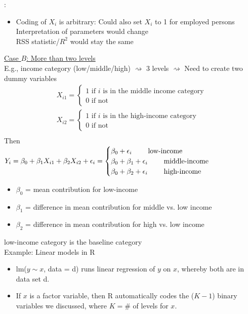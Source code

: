 \documentclass[11pt,a4paper,numbers=endperiod]{scrartcl}
\newcommand{\id}{\hspace*{4mm}}
\newcommand{\tit}[1]{\begin{large} \underline{\text{#1}}\end{large}}
\begin{document}
{\tit{Note}: \begin{itemize}
	\item Coding of $X_i$ is arbitrary: Could also set $X_i$ to 1 for employed persons\\
	\id {} Interpretation of parameters would change\\
	\id {} RSS statistic/$R^2$ would stay the same
\end{itemize}
\underline{Case $B$: More than two levels}\\
E.g., income category (low/middle/high) $\rightsquigarrow$ 3 levels $\rightsquigarrow$ Need to create two dummy variables \begin{align*}
	X_{i1} = \begin{cases}
	 1 \text{ if $i$ is in the middle income category}\\
	 0 \text{ if not}
	\end{cases}\\
	X_{i2} = \begin{cases}
	1 \text{ if $i$ is in the high-income category}\\
	0 \text{ if not}
	\end{cases}\\
\end{align*}
Then\\
$Y_i = \beta_0 + \beta_1 X_{i1} + \beta_2 X_{i2} + \epsilon_i = \begin{cases}
	\beta_0 + \epsilon_i \id \id \text{low-income}\\
	\beta_0 +  \beta_1 + \epsilon_i \id \id \text{middle-income}\\
	\beta_0 + \beta_2 + \epsilon_i \id \id \text{high-income}\\
\end{cases}$ \begin{itemize}
	\item $\beta_0$ = mean contribution for low-income
	\item $\beta_1$ = difference in mean contribution for middle vs. low income
	\item $\beta_2$ = difference in mean contribution for high vs. low income
\end{itemize}
\id low-income category is the baseline category\\

Example: Linear models in R \begin{itemize}
	\item lm($y \sim x$, data = d) runs linear regression of $y$ on $x$, whereby both are in data set d.
	\item If $x$ is a factor variable, then R automatically codes the ($K-1$) binary variables we discussed, where $K = \#$ of levels for $x$.
\end{itemize}

}
\end{document}
